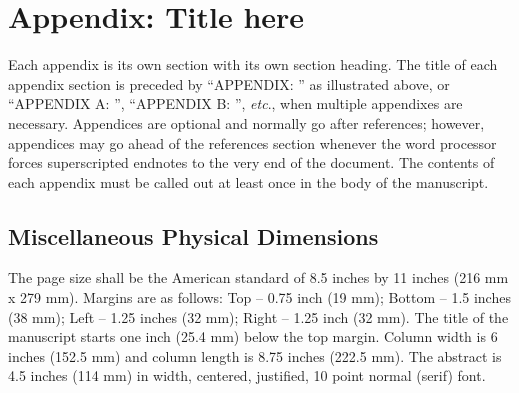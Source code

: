 \documentclass[letterpaper, preprint, paper,11pt]{AAS}	%
\begin{document}
\appendix
\section*{Appendix: Title here}
Each appendix is its own section with its own section heading. The title of each appendix section is preceded by ``APPENDIX: '' as illustrated above, or ``APPENDIX A: '', ``APPENDIX B: '', \emph{etc}., when multiple appendixes are necessary. Appendices are optional and normally go after references; however, appendices may go ahead of the references section whenever the word processor forces superscripted endnotes to the very end of the document. The contents of each appendix must be called out at least once in the body of the manuscript.


\subsection*{Miscellaneous Physical Dimensions}
The page size shall be the American standard of 8.5 inches by 11 inches (216 mm x 279 mm). Margins are as follows: Top -- 0.75 inch (19 mm); Bottom -- 1.5 inches (38 mm); Left -- 1.25 inches (32 mm); Right -- 1.25 inch (32 mm). The title of the manuscript starts one inch (25.4 mm) below the top margin. Column width is 6 inches (152.5 mm) and column length is 8.75 inches (222.5 mm). The abstract is 4.5 inches (114 mm) in width, centered, justified, 10 point normal (serif) font.


\end{document}
